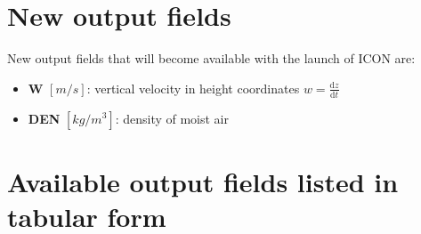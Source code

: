 \section{New output fields}
New output fields that will become available with the launch of ICON are:
\begin{itemize}
 \item \textbf{W} $[m/s]$: vertical velocity in height coordinates $w=\frac{\mathrm{d}z}{\mathrm{d}t}$
 \item \textbf{DEN} $[kg/m^{3}]$: density of moist air
\end{itemize}


\section{Available output fields listed in tabular form}

